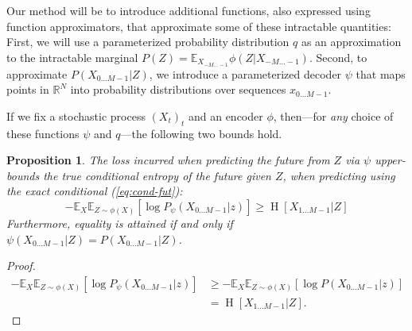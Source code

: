 \documentclass[11pt,letterpaper]{article}
\newcommand{\E}[0]{\mathbb{E}}
\newcounter{theorem}
\newtheorem{proposition}[theorem]{Proposition}
\begin{document}
Our method will be to introduce additional functions, also expressed using function approximators, that approximate some of these intractable quantities:
First, we will use a parameterized probability distribution $q$ as an approximation to the intractable marginal $P(Z) = \E_{X_{-M \dots -1}} \phi(Z|X_{-M \dots -1})$.
Second, to approximate $P(X_{0\dots M-1}|Z)$, we introduce a parameterized decoder $\psi$ that maps points in $\mathbb{R}^N$  into probability distributions over sequences $x_{0\dots M-1}$.

If we fix a stochastic process $(X_t)_t$ and an encoder $\phi$, then---for \emph{any} choice of these functions $\psi$ and $q$---the following two bounds hold.

\begin{proposition}
The loss incurred when predicting the future from $Z$ via $\psi$ upper-bounds the true conditional entropy of the future given $Z$, when predicting using the exact conditional (\ref{eq:cond-fut}):
\begin{equation}\label{ineq1}
	-	\mathbb{E}_{X}\mathbb{E}_{Z \sim \phi(X)}\left[\log P_\psi(X_{0\dots M-1} | z)\right] \geq \operatorname{H}[X_{1\dots M-1}|Z]
\end{equation}
Furthermore, equality is attained if and only if $\psi(X_{0\dots M-1}|Z) = P(X_{0\dots M-1}|Z)$.
\end{proposition}

\begin{proof}
\begin{align*}
	-	\mathbb{E}_{X}\mathbb{E}_{Z \sim \phi(X)}\left[\log P_\psi(X_{0\dots M-1} | z)\right] & \geq -	\mathbb{E}_{X}\mathbb{E}_{Z \sim \phi(X)}\left[\log P(X_{0\dots M-1} | z)\right]\\
	&= \operatorname{H}[X_{1\dots M-1}|Z].
\end{align*}
\end{proof}
\end{document}
